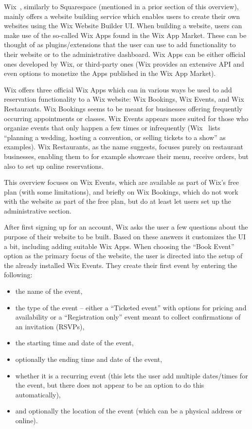 Wix~\cite{wix}, similarly to Squarespace (mentioned in a prior section of this overview), mainly offers a website building service which enables users to create their own websites using the Wix Website Builder UI. When building a website, users can make use of the so-called Wix Apps found in the Wix App Market. These can be thought of as plugins/extensions that the user can use to add functionality to their website or to the administrative dashboard. Wix Apps can be either official ones developed by Wix, or third-party ones (Wix provides an extensive API and even options to monetize the Apps published in the Wix App Market).

Wix offers three official Wix Apps which can in various ways be used to add reservation functionality to a Wix website: Wix Bookings, Wix Events, and Wix Restaurants. Wix Bookings seems to be meant for businesses offering frequently occurring appointments or classes. Wix Events appears more suited for those who organize events that only happen a few times or infrequently (Wix~\cite{wix} lists \enquote{planning a wedding, hosting a convention, or selling tickets to a show} as examples). Wix Restaurants, as the name suggests, focuses purely on restaurant businesses, enabling them to for example showcase their menu, receive orders, but also to set up online reservations.

This overview focuses on Wix Events, which are available as part of Wix's free plan (with some limitations), and briefly on Wix Bookings, which do not work with the website as part of the free plan, but do at least let users set up the administrative section.

After first signing up for an account, Wix asks the user a few questions about the purpose of their website to be built. Based on these answers it customizes the UI a bit, including adding suitable Wix Apps. When choosing the \enquote{Book Event} option as the primary focus of the website, the user is directed into the setup of the already installed Wix Events. They create their first event by entering the following:
\begin{itemize}
    \item the name of the event,
    \item the type of the event -- either a \enquote{Ticketed event} with options for pricing and availability or a \enquote{Registration only} event meant to collect confirmations of an invitation (RSVPs),
    \item the starting time and date of the event,
    \item optionally the ending time and date of the event,
    \item whether it is a recurring event (this lets the user add multiple dates/times for the event, but there does not appear to be an option to do this automatically),
    \item and optionally the location of the event (which can be a physical address or online).
\end{itemize}


